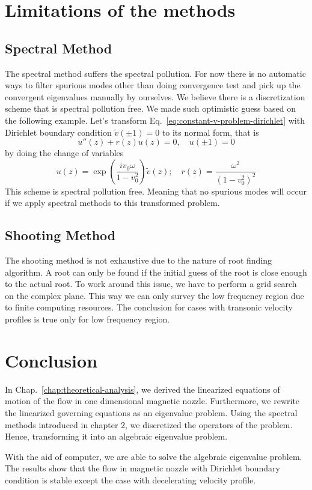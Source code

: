 \section{Limitations of the methods}
\subsection{Spectral Method}
The spectral method suffers the spectral pollution. For now there is no automatic ways to filter spurious modes other than doing convergence test and pick up the convergent eigenvalues manually by ourselves. We believe there is a discretization scheme that is spectral pollution free. We made such optimistic guess based on the following example. Let's transform Eq.~\ref{eq:constant-v-problem-dirichlet} with Dirichlet boundary condition $\tilde{v}(\pm 1) = 0$ to its normal form, that is
\begin{equation}
	u''(z) + r(z)u(z) = 0, \quad u(\pm 1) = 0
\end{equation}
by doing the change of variables
\begin{equation}
	u(z) = \exp\left(\frac{iv_0\omega}{1-v_0^2}\right)\tilde{v}(z); \quad
	r(z) = \frac{\omega^2}{(1-v_0^2)^2}
\end{equation}
This scheme is spectral pollution free. Meaning that no spurious modes will occur if we apply spectral methods to this transformed problem.


\subsection{Shooting Method}
The shooting method is not exhaustive due to the nature of root finding algorithm. A root can only be found if the initial guess of the root is close enough to the actual root. To work around this issue, we have to perform a grid search on the complex plane. This way we can only survey the low frequency region due to finite computing resources. The conclusion for cases with transonic velocity profiles is true only for low frequency region.

\section{Conclusion}
In Chap.~\ref{chap:theoretical-analysis}, we derived the linearized equations of motion of the flow in one dimensional magnetic nozzle. Furthermore, we rewrite the linearized governing equations as an eigenvalue problem. Using the spectral methods introduced in chapter 2, we discretized the operators of the problem. Hence, transforming it into an algebraic eigenvalue problem.

With the aid of computer, we are able to solve the algebraic eigenvalue problem. The results show that the flow in magnetic nozzle with Dirichlet boundary condition is stable except the case with decelerating velocity profile.
